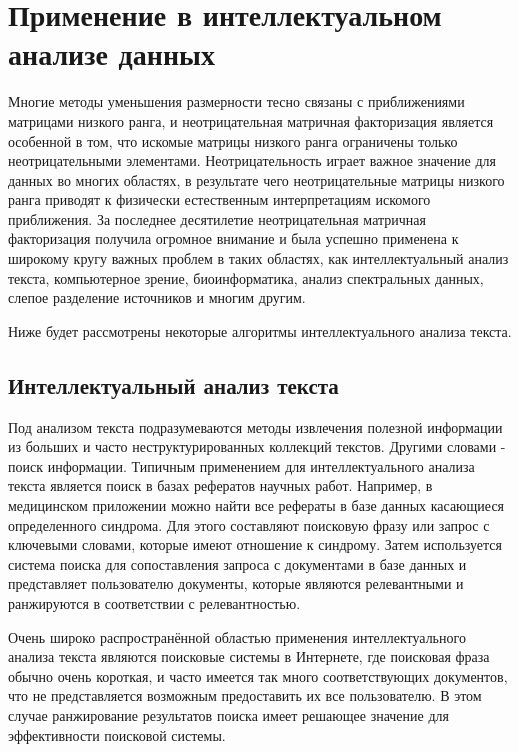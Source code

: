 
\newpage
\chapter{Применение в интеллектуальном анализе данных}

Многие методы уменьшения размерности тесно связаны с приближениями матрицами низкого ранга,
и неотрицательная матричная факторизация является особенной в том,
что искомые матрицы низкого ранга ограничены только неотрицательными элементами.
Неотрицательность играет важное значение для данных во многих областях,
в результате чего неотрицательные матрицы низкого ранга приводят к физически естественным интерпретациям искомого приближения.
За последнее десятилетие неотрицательная матричная факторизация получила огромное внимание и была успешно применена к широкому кругу важных проблем в таких областях,
как интеллектуальный анализ текста, компьютерное зрение, биоинформатика, анализ спектральных данных, слепое разделение источников и многим другим.

Ниже будет рассмотрены некоторые алгоритмы интеллектуального анализа текста.





\newpage





\section{Интеллектуальный анализ текста}

Под анализом текста подразумеваются методы извлечения полезной информации из больших и часто неструктурированных коллекций текстов.
Другими словами - поиск информации.
Типичным применением для интеллектуального анализа текста является поиск в базах рефератов научных работ.
Например, в медицинском приложении можно найти все рефераты в базе данных касающиеся определенного синдрома.
Для этого составляют поисковую фразу или запрос с ключевыми словами, которые имеют отношение к синдрому.
Затем используется система поиска для сопоставления запроса с документами в базе данных и представляет пользователю документы,
которые являются релевантными и ранжируются в соответствии с релевантностью.

Очень широко распространённой областью применения интеллектуального анализа текста
являются поисковые системы в Интернете, где поисковая фраза обычно очень короткая,
и часто имеется так много соответствующих документов, что не представляется возможным предоставить их все пользователю.
В этом случае ранжирование результатов поиска имеет решающее значение для эффективности поисковой системы.

